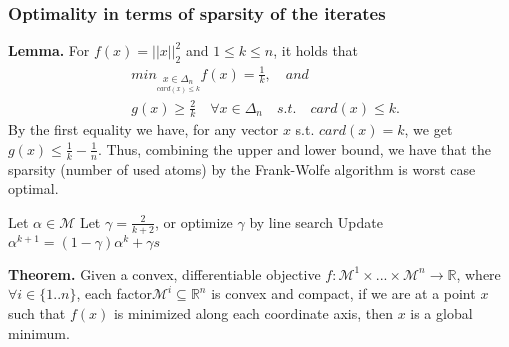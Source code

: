 \subsubsection{Optimality in terms of sparsity of the iterates}
\textbf{Lemma.} For $f(x)= ||x||_{2}^{2}$ and $1\leq k\leq n$, it holds that
\begin{equation*}
\begin{aligned}
      &\textit{min}_{\underset{card(x)\leq
      k}{x\in\Delta_{n}}}f(x)= \frac{1}{k},\quad\textit{and}\\
      &g(x)\geq \frac{2}{k}\quad\forall x\in\Delta_{n}\quad\textit{s.t.}\quad card(x)\leq k.
\end{aligned}
\end{equation*}
By the first equality we have, for any vector $x$ s.t. $card(x)= k$, we get $g(x)\leq \frac{1}{k}- \frac{1}{n}$.
Thus, combining the upper and lower bound, we have that the sparsity (number of used atoms) by the Frank-Wolfe algorithm is worst case optimal.
\begin{algorithmic}
   \STATE Let $\alpha\in\mathcal{M}$
   \STATE Let $\gamma = \frac{2}{k+2}$, or optimize $\gamma$ by line search
   \STATE Update $\alpha^{k+1}= (1-\gamma)\alpha^{k}+ \gamma s$
   \ENDFOR
\end{algorithmic}
\textbf{Theorem.} Given a convex, differentiable objective
$f:\mathcal{M}^{1}\times...\times\mathcal{M}^{n}\to\mathbb{R}$, where $\forall
i\in\{1..n\}$, each factor\quad $\mathcal{M}^{i}\subseteq\mathbb{R}^{n}$ is
convex and compact, if we are at a point $x$ such that $f(x)$ is minimized along
each coordinate axis, then $x$ is a global minimum.\\

